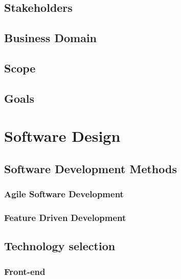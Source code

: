 \documentclass[]{article}
\begin{document}
\subsection{Stakeholders}


\subsection{Business Domain}


\subsection{Scope}


\subsection{Goals}

\pagebreak

\section{Software Design}
\subsection{Software Development Methods}

\subsubsection{Agile Software Development}

\subsubsection{Feature Driven Development}


\pagebreak

\subsection{Technology selection}

\subsubsection{Front-end}
            
\end{document}
